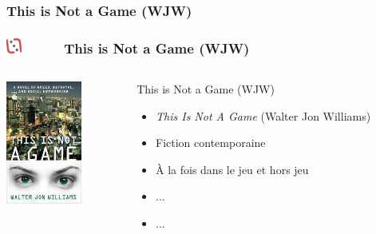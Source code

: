 \documentclass[slidetop,11pt]{beamer}
\def\sectionPartIIaVI{ This is Not a Game (WJW) }
\def\moreInFrameTitleLeftt{\includegraphics[height=0.5cm]{img/ligueludique-0.png}~~~~~}
\begin{document}
\subsubsection{\sectionPartIIaVI}
\begin{frame}
	\frametitle{\moreInFrameTitleLeftt \sectionPartIIaVI }
	\begin{columns}[T]
		\begin{column}[T]{4.1cm}
			\includegraphics[height=4.05cm]{img/thisIsNotAGameWJW.jpg}
		\end{column}
		\begin{column}[T]{7cm}
			 \begin{beamerboxesrounded}	[lower=substructureRED, %
							 upper=block title RED,%
							 shadow=true]%
				   {\sectionPartIIaVI}
				\begin{itemize}
					\item \emph{This Is Not A Game} (Walter Jon Williams)
					\item Fiction contemporaine
					\item {\`A} la fois dans le jeu et hors jeu
					\item ...
					\item ...
				\end{itemize}
			\end{beamerboxesrounded}
		\end{column}
	\end{columns}
\end{frame} 
\end{document}
